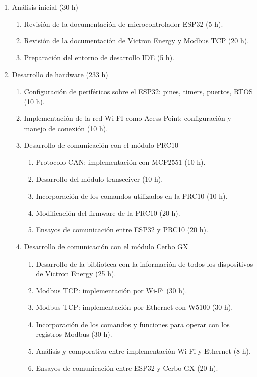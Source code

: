 \documentclass[
11pt, %
]{charter}
\begin{document}
\begin{enumerate}
\item Análisis inicial (30 h)
	\begin{enumerate}
	\item Revisión de la documentación de microcontrolador ESP32 (5 h).
	\item Revisión de la documentación de Victron Energy y Modbus TCP (20 h).
	\item Preparación del entorno de desarrollo IDE (5 h).
	\end{enumerate}
\item Desarrollo de hardware (233 h)
	\begin{enumerate}
	\item Configuración de periféricos sobre el ESP32: pines, timers, puertos, RTOS (10 h).
	\item Implementación de la red Wi-FI como Acess Point: configuración y manejo de conexión (10 h).
	\item Desarrollo de comunicación con el módulo PRC10
		\begin{enumerate}
		\item Protocolo CAN: implementación con MCP2551 (10 h).
		\item Desarrollo del módulo transceiver (10 h).
		\item Incorporación de los comandos utilizados en la PRC10 (10 h).
		\item Modificación del firmware de la PRC10 (20 h).
		\item Ensayos de comunicación entre ESP32 y PRC10 (20 h).
		\end{enumerate}	
	\item Desarrollo de comunicación con el módulo Cerbo GX
		\begin{enumerate}
		\item Desarrollo de la biblioteca con la información de todos los dispositivos de Victron Energy (25 h).
		\item Modbus TCP: implementación por Wi-Fi (30 h).
		\item Modbus TCP: implementación por Ethernet con W5100 (30 h).		
		\item Incorporación de los comandos y funciones para operar con los registros Modbus (30 h).
		\item Análisis y comporativa entre implementación Wi-Fi y Ethernet (8 h).
		\item Ensayos de comunicación entre ESP32 y Cerbo GX (20 h).
		\end{enumerate}		
	\end{enumerate}

\end{enumerate}
\end{document}
